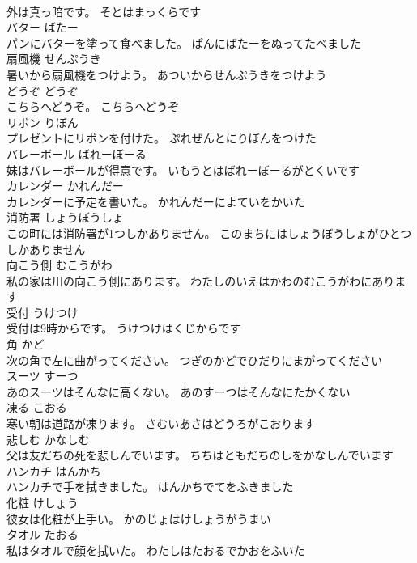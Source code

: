 \documentclass[8pt]{extreport}
\begin{document}
\begin{CJK}{UTF8}{min}
\\	外は真っ暗です。	そとはまっくらです	
\\	バター	ばたー	
\\	パンにバターを塗って食べました。	ぱんにばたーをぬってたべました	
\\	扇風機	せんぷうき	
\\	暑いから扇風機をつけよう。	あついからせんぷうきをつけよう	
\\	どうぞ	どうぞ	
\\	こちらへどうぞ。	こちらへどうぞ	
\\	リボン	りぼん	
\\	プレゼントにリボンを付けた。	ぷれぜんとにりぼんをつけた	
\\	バレーボール	ばれーぼーる	
\\	妹はバレーボールが得意です。	いもうとはばれーぼーるがとくいです	
\\	カレンダー	かれんだー	
\\	カレンダーに予定を書いた。	かれんだーによていをかいた	
\\	消防署	しょうぼうしょ	
\\	この町には消防署が1つしかありません。	このまちにはしょうぼうしょがひとつしかありません	
\\	向こう側	むこうがわ	
\\	私の家は川の向こう側にあります。	わたしのいえはかわのむこうがわにあります	
\\	受付	うけつけ	
\\	受付は9時からです。	うけつけはくじからです	
\\	角	かど	
\\	次の角で左に曲がってください。	つぎのかどでひだりにまがってください	
\\	スーツ	すーつ	
\\	あのスーツはそんなに高くない。	あのすーつはそんなにたかくない	
\\	凍る	こおる	
\\	寒い朝は道路が凍ります。	さむいあさはどうろがこおります	
\\	悲しむ	かなしむ	
\\	父は友だちの死を悲しんでいます。	ちちはともだちのしをかなしんでいます	
\\	ハンカチ	はんかち	
\\	ハンカチで手を拭きました。	はんかちでてをふきました	
\\	化粧	けしょう	
\\	彼女は化粧が上手い。	かのじょはけしょうがうまい	
\\	タオル	たおる	
\\	私はタオルで顔を拭いた。	わたしはたおるでかおをふいた	

\end{CJK}
\end{document}
